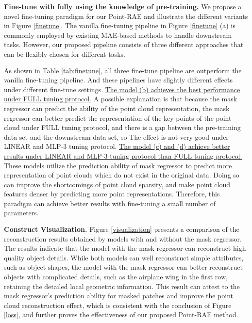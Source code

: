 \documentclass[sigconf, screen]{acmart}
\begin{document}
\noindent \textbf{Fine-tune with fully using the knowledge of pre-training.}
We propose a novel fine-tuning paradigm for our Point-RAE and illustrate the different variants in Figure \ref{finetune}. The vanilla fine-tuning pipeline in Figure \ref{finetune} (a) is commonly employed by existing MAE-based methods to handle downstream tasks. However, our proposed pipeline consists of three different approaches that can be flexibly chosen for different tasks.


As shown in Table \ref{tab:finetune}, all three fine-tune pipeline are outperform the vanilla fine-tuning pipeline.
And these pipelines have slightly different effects under different fine-tune settings.
\uline{The model (b) achieves the best performance under FULL tuning protocol.}
A possible explanation is that because the mask regressor can predict the ability of the point cloud representation, the mask regressor can better predict the representation of the key points of the point cloud under FULL tuning protocol, and there is a gap between the pre-training data set and the downstream data set, so The effect is not very good under LINEAR and MLP-3 tuning protocol.
\uline{The model (c) and (d) achieve better results under LINEAR and MLP-3 tuning protocol than FULL tuning protocol.}
These models utilize the prediction ability of mask regressor to predict more representation of point clouds which do not exist in the original data.
Doing so can improve the shortcomings of point cloud sparsity, and make point cloud features denser by predicting more point representations.
Therefore, this paradigm can achieve better results with fine-tuning a small number of parameters.



\noindent \textbf{Construct Visualization.}
Figure \ref{visualization} presents a comparison of the reconstruction results obtained by models with and without the mask regressor. The results indicate that the model with the mask regressor can reconstruct high-quality object details. While both models can well reconstruct simple attributes, such as object shapes, the model with the mask regressor can better reconstruct objects with complicated details, such as the airplane wing in the first row, retaining the detailed local geometric information. 
This result can attest to the mask regressor's prediction ability for masked patches and improve the point cloud reconstruction effect, which is consistent with the conclusion of Figure \ref{loss}, and further proves the effectiveness of our proposed Point-RAE method.
\end{document}
